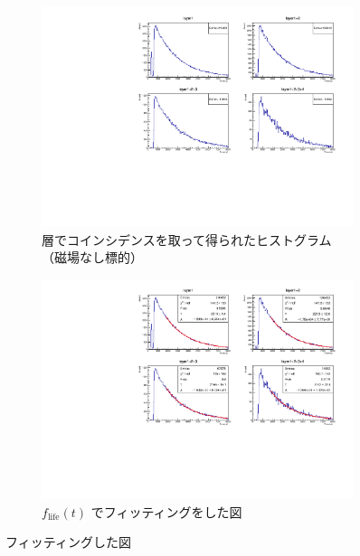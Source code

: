 \begin{figure}[H]
\centering
\begin{subfigure}{\columnwidth}
\centering
\includegraphics[height = 0.9\columnwidth , angle = -90]{figure/ikemitsu/lt_layercoin.pdf}
\caption{層でコインシデンスを取って得られたヒストグラム（磁場なし標的）}
\label{lt_layercoin}
\end{subfigure}
\begin{subfigure}{\columnwidth}
\centering
\includegraphics[height = 0.9\columnwidth , angle = -90]{figure/ikemitsu/lt_layercoin_fit.pdf}
\caption{$f_{\mathrm{life}}(t)$ でフィッティングをした図}
\label{lt_layercoin_fit}
\end{subfigure}
\caption{フィッティングした図}
\label{lt_layercoin_all}
\end{figure}
  
